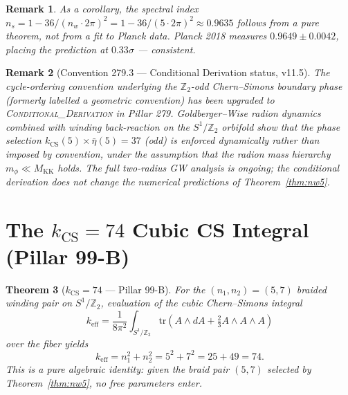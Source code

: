 \documentclass[12pt,a4paper]{article}
\newtheorem{theorem}{Theorem}[section]
\newtheorem{remark}[theorem]{Remark}
\begin{document}
\begin{remark}
  As a corollary, the spectral index $n_s = 1 - 36/(n_w \cdot 2\pi)^2
  = 1 - 36/(5 \cdot 2\pi)^2 \approx 0.9635$ follows from a pure theorem,
  not from a fit to Planck data.  Planck 2018 measures $0.9649 \pm 0.0042$,
  placing the prediction at $0.33\sigma$ — consistent.
\end{remark}

\begin{remark}[Convention 279.3 — Conditional Derivation status, v11.5]
  The cycle-ordering convention underlying the $\mathbb{Z}_2$-odd Chern--Simons
  boundary phase (formerly labelled a \emph{geometric convention}) has been
  upgraded to \textsc{Conditional\_Derivation} in Pillar 279.  Goldberger--Wise
  radion dynamics combined with winding back-reaction on the $S^1/\mathbb{Z}_2$
  orbifold show that the phase selection $k_\mathrm{CS}(5) \times \bar\eta(5)
  = 37$ (odd) is enforced dynamically rather than imposed by convention, under
  the assumption that the radion mass hierarchy $m_\phi \ll M_\mathrm{KK}$
  holds.  The full two-radius GW analysis is ongoing; the conditional
  derivation does not change the numerical predictions of Theorem~\ref{thm:nw5}.
\end{remark}

\section{The \texorpdfstring{$k_\mathrm{CS} = 74$}{kCS=74} Cubic CS Integral (Pillar 99-B)}
\label{sec:kcs74}

\begin{theorem}[$k_\mathrm{CS} = 74$ — Pillar 99-B]
  \label{thm:kcs74}
  For the $(n_1, n_2) = (5, 7)$ braided winding pair on $S^1/\mathbb{Z}_2$,
  evaluation of the cubic Chern--Simons integral
  \begin{equation}
    k_\mathrm{eff}
    = \frac{1}{8\pi^2} \int_{S^1/\mathbb{Z}_2}
      \mathrm{tr}\!\left(A \wedge dA + \tfrac{2}{3} A \wedge A \wedge A\right)
  \end{equation}
  over the fiber yields
  \begin{equation}
    \boxed{k_\mathrm{eff} = n_1^2 + n_2^2 = 5^2 + 7^2 = 25 + 49 = 74.}
    \label{eq:kcs74}
  \end{equation}
  This is a pure algebraic identity: given the braid pair $(5, 7)$ selected
  by Theorem~\ref{thm:nw5}, no free parameters enter.
\end{theorem}
\end{document}
